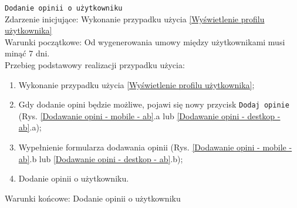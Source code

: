\texttt{Dodanie opinii o użytkowniku} \\
Zdarzenie inicjujące: Wykonanie przypadku użycia \ref{Wyświetlenie profilu użytkownika} \\
Warunki początkowe: Od wygenerowania umowy między użytkownikami musi minąć 7 dni. \\
Przebieg podstawowy realizacji przypadku użycia: \\
\begin{enumerate}
   \item Wykonanie przypadku użycia \ref{Wyświetlenie profilu użytkownika};
   \item Gdy dodanie opini będzie możliwe, pojawi się nowy przycisk \texttt{Dodaj opinie} (Rys. \ref{Dodawanie opini - mobile - ab}.a lub \ref{Dodawanie opini - destkop - ab}.a);
   \item Wypełnienie formularza dodawania opinii (Rys. \ref{Dodawanie opini - mobile - ab}.b lub \ref{Dodawanie opini - destkop - ab}.b);
   \item Dodanie opinii o użytkowniku.
\end{enumerate}
Warunki końcowe: Dodanie opinii o użytkowniku \\
